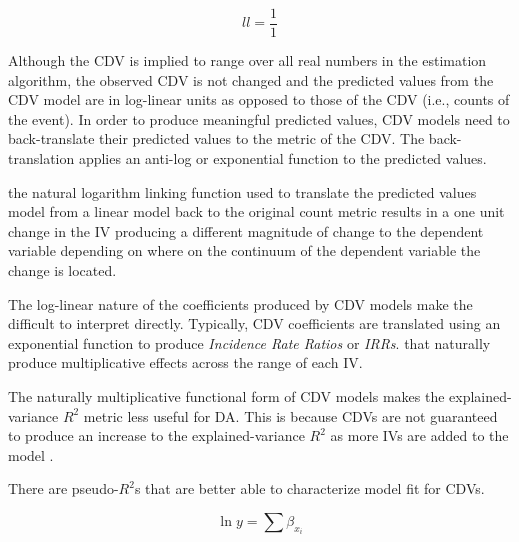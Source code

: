 \documentclass[ShortAfour,times,sageapa]{sagej}
\begin{document}
  	\begin{equation}
  		ll = \frac{1}{1}
  	\end{equation}
  	
  	Although the CDV is implied to range over all real numbers in the estimation algorithm, the observed CDV is not changed and the predicted values from the CDV model are in log-linear units as opposed to those of the CDV (i.e., counts of the event).  	
  	In order to produce meaningful predicted values, CDV models need to back-translate their predicted values to the metric of the CDV.  The back-translation applies an anti-log or exponential function to the predicted values.
  	 
  	the natural logarithm linking function used to translate the predicted values
  	model from a linear model back to the original count metric results in a one unit change in the IV producing a different magnitude of change to the dependent variable depending on where on the continuum of the dependent variable the change is located. 

	The log-linear nature of the coefficients produced by CDV models make the difficult to interpret directly. 
	Typically, CDV coefficients are translated using an exponential function to produce \emph{Incidence Rate Ratios} or \emph{IRRs}.  
	that naturally produce multiplicative effects across the range of each IV.

	The naturally multiplicative functional form of CDV models makes the explained-variance $R^2$ metric less useful for DA.  This is because CDVs are not guaranteed to produce an increase to the explained-variance $R^2$ as more IVs are added to the model \cite{}.  
	
	There are pseudo-$R^2$s that are better able to characterize model fit for CDVs.  
	
	
	\begin{equation}
		\ln{y} = \sum{\beta_{x_i}}
	\end{equation}




	
\end{document}
